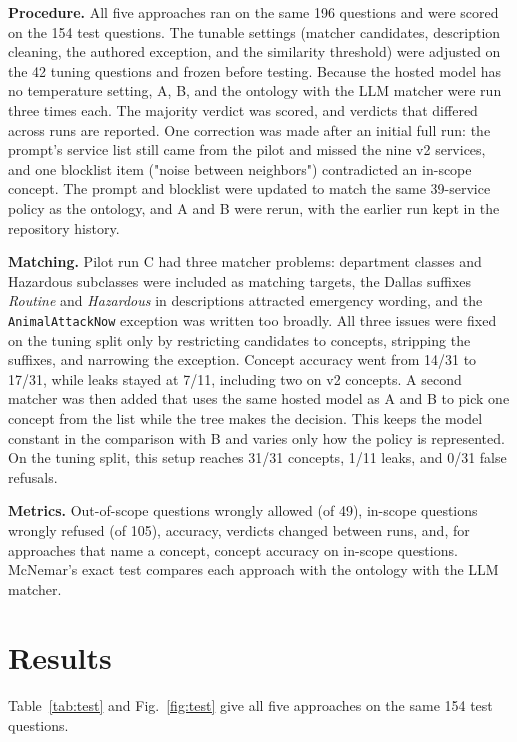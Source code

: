 \documentclass[conference]{IEEEtran}
\begin{document}
\textbf{Procedure.} All five approaches ran on the same 196 questions and were scored on the 154 test questions. The tunable settings (matcher candidates, description cleaning, the authored exception, and the similarity threshold) were adjusted on the 42 tuning questions and frozen before testing. Because the hosted model has no temperature setting, A, B, and the ontology with the LLM matcher were run three times each. The majority verdict was scored, and verdicts that differed across runs are reported. One correction was made after an initial full run: the prompt's service list still came from the pilot and missed the nine v2 services, and one blocklist item ("noise between neighbors") contradicted an in-scope concept. The prompt and blocklist were updated to match the same 39-service policy as the ontology, and A and B were rerun, with the earlier run kept in the repository history.

\textbf{Matching.} Pilot run C had three matcher problems: department classes and Hazardous subclasses were included as matching targets, the Dallas suffixes \emph{Routine} and \emph{Hazardous} in descriptions attracted emergency wording, and the \texttt{AnimalAttackNow} exception was written too broadly. All three issues were fixed on the tuning split only by restricting candidates to concepts, stripping the suffixes, and narrowing the exception. Concept accuracy went from 14/31 to 17/31, while leaks stayed at 7/11, including two on v2 concepts. A second matcher was then added that uses the same hosted model as A and B to pick one concept from the list while the tree makes the decision. This keeps the model constant in the comparison with B and varies only how the policy is represented. On the tuning split, this setup reaches 31/31 concepts, 1/11 leaks, and 0/31 false refusals.

\textbf{Metrics.} Out-of-scope questions wrongly allowed (of 49), in-scope questions wrongly refused (of 105), accuracy, verdicts changed between runs, and, for approaches that name a concept, concept accuracy on in-scope questions. McNemar's exact test compares each approach with the ontology with the LLM matcher.

\section{Results}

Table~\ref{tab:test} and Fig.~\ref{fig:test} give all five approaches on the same 154 test questions.
\end{document}
